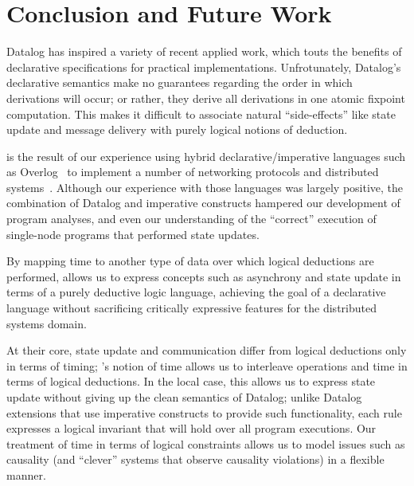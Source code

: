 \section{Conclusion and Future Work}

Datalog has inspired a variety of recent applied work, which touts the benefits of declarative specifications for practical implementations.  Unfrotunately, Datalog's declarative semantics make no guarantees
regarding the order in which derivations will occur; or rather, they derive all derivations in one atomic fixpoint computation.  This makes it difficult to associate natural ``side-effects'' like state update and message delivery with purely logical notions of deduction.


\lang is the result of our experience using hybrid declarative/imperative languages such as
Overlog~\cite{Loo2009-CACM} to implement a number of networking protocols
and distributed systems~\cite{boom-techr,Loo2009-CACM,Alvaro2009I-Do-Declare:-C,Chu:2007}.  Although our experience with those
languages was largely positive, the combination of Datalog and imperative constructs hampered our development of program analyses, and even our understanding of the ``correct'' execution of single-node programs that performed state updates.


By mapping time to another type of data over which logical deductions
are performed, \lang allows us to express concepts such as asynchrony and state update in terms of a purely deductive logic
language, achieving the goal of a declarative language without sacrificing critically expressive features for the distributed systems domain.

At their core, state update and communication differ from logical
deductions only in terms of timing; \lang's notion of time allows us
to interleave operations and time in terms of logical deductions.
In the local case, this allows us to express state update without giving up the clean semantics of Datalog; unlike
Datalog extensions that use imperative constructs to provide such
functionality, each \lang rule expresses a logical invariant that will
hold over all program executions.  
Our treatment of time in terms of
logical constraints allows us to model issues such as causality (and
``clever'' systems that observe causality violations) in a flexible
manner.

